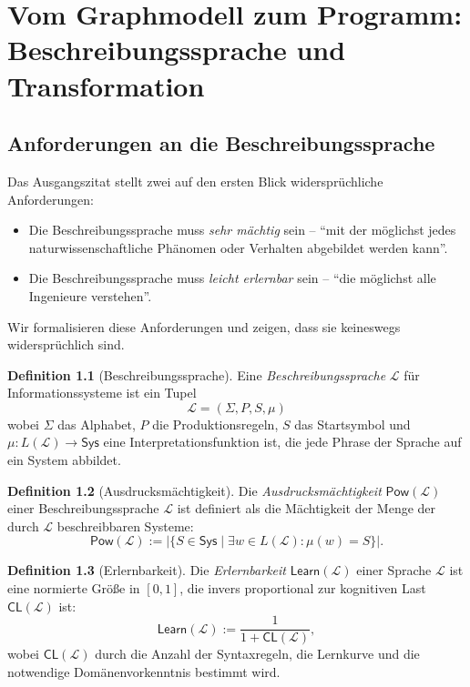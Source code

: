 ﻿\documentclass[a4paper,12pt]{report}
\theoremstyle{definition}
\newtheorem{definition}{Definition}[section]
\begin{document}
\chapter{Vom Graphmodell zum Programm: Beschreibungssprache und Transformation}
\label{ch:vom_modell_zum_programm}
\label{sec:beschreibungssprache}

\section{Anforderungen an die Beschreibungssprache}

Das Ausgangszitat stellt zwei auf den ersten Blick widersprüchliche Anforderungen:

\begin{itemize}
  \item Die Beschreibungssprache muss \emph{sehr mächtig} sein -- \enquote{mit der möglichst
        jedes naturwissenschaftliche Phänomen oder Verhalten abgebildet werden kann}.
  \item Die Beschreibungssprache muss \emph{leicht erlernbar} sein -- \enquote{die möglichst
        alle Ingenieure verstehen}.
\end{itemize}

Wir formalisieren diese Anforderungen und zeigen, dass sie keineswegs widersprüchlich sind.

\begin{definition}[Beschreibungssprache]
\label{def:beschrsprache}
Eine \emph{Beschreibungssprache} $\mathcal{L}$ für Informationssysteme ist ein Tupel
\[
  \mathcal{L} = (\Sigma, P, S, \mu)
\]
wobei $\Sigma$ das Alphabet, $P$ die Produktionsregeln, $S$ das Startsymbol und
$\mu: L(\mathcal{L}) \to \mathsf{Sys}$ eine Interpretationsfunktion ist, die jede
Phrase der Sprache auf ein System abbildet.
\end{definition}

\begin{definition}[Ausdrucksmächtigkeit]
\label{def:maechtigkeit}
Die \emph{Ausdrucksmächtigkeit} $\mathsf{Pow}(\mathcal{L})$ einer Beschreibungssprache
$\mathcal{L}$ ist definiert als die Mächtigkeit der Menge der durch $\mathcal{L}$
beschreibbaren Systeme:
\[
  \mathsf{Pow}(\mathcal{L}) := |\{S \in \mathsf{Sys} \mid \exists w \in L(\mathcal{L}): \mu(w) = S\}|.
\]
\end{definition}

\begin{definition}[Erlernbarkeit]
\label{def:erlernbarkeit}
Die \emph{Erlernbarkeit} $\mathsf{Learn}(\mathcal{L})$ einer Sprache $\mathcal{L}$ ist eine
normierte Größe in $[0, 1]$, die invers proportional zur kognitiven Last
$\mathsf{CL}(\mathcal{L})$ ist:
\[
  \mathsf{Learn}(\mathcal{L}) := \frac{1}{1 + \mathsf{CL}(\mathcal{L})},
\]
wobei $\mathsf{CL}(\mathcal{L})$ durch die Anzahl der Syntaxregeln, die
Lernkurve und die notwendige Domänenvorkenntnis bestimmt wird.
\end{definition}
\end{document}
